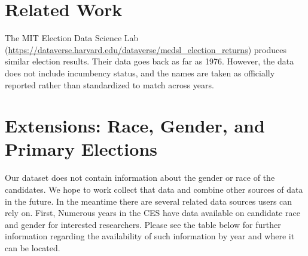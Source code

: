 \documentclass[12pt]{article}
\begin{document}
\section{Related Work}

The MIT Election Data Science Lab (\url{https://dataverse.harvard.edu/dataverse/medsl\_election\_returns}) produces similar election results. Their data goes back as far as 1976. However, the data does not include incumbency status, and the names are taken as officially reported rather than standardized to match across years.




\section{Extensions: Race, Gender, and Primary Elections}

Our dataset does not contain information about the gender or race of the candidates. We hope to work collect that data and combine other sources of data in the future.  In the meantime there are several related data sources users can rely on. First, Numerous years in the CES have data available on candidate race and gender for interested researchers. Please see the table below for further information regarding the availability of such information by year and where it can be located. 
\end{document}
